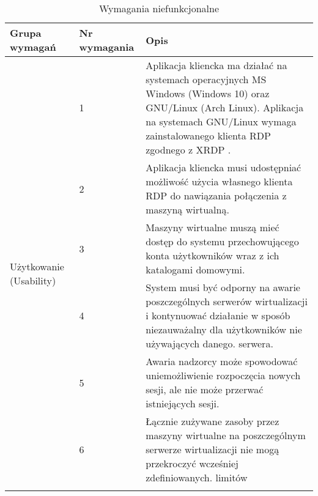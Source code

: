 \documentclass[../wstep.tex]{subfiles}
\begin{document}
\label{requirements:nonfunctional}

\begin{table}[H]
    \caption[Wymagania niefunkcjonalne]{Wymagania niefunkcjonalne}
    \label{non-functional}
    \centering
    \begin{tabular}{|p{}|p{}|p{}|}
        \hline Grupa wymagań                            & Nr wymagania & Opis                                                                                                                                                                                                                       \\ \hline
        \multirow[t]{10}{=}{Użytkowanie (Usability)}    & 1            & Aplikacja kliencka ma działać na systemach operacyjnych MS Windows (Windows 10) oraz GNU/Linux (Arch Linux). Aplikacja na systemach GNU/Linux wymaga zainstalowanego klienta RDP zgodnego z XRDP \parencite{xrdp-clients}. \\ \cline{2-3}
                                                        & 2            & Aplikacja kliencka musi udostępniać możliwość użycia własnego klienta RDP do nawiązania połączenia z maszyną wirtualną.                                                                                                     \\ \cline{2-3}
                                                        & 3            & Maszyny wirtualne muszą mieć dostęp do systemu przechowującego konta użytkowników wraz z ich katalogami domowymi.                                                                                                           \\ \hline
        \multirow[t]{7}{=}{Niezawodność (Reliability)}  & 4            & System musi być odporny na awarie poszczególnych serwerów wirtualizacji i kontynuować działanie w sposób niezauważalny dla użytkowników nie używających danego. serwera.                                                    \\ \cline{2-3}
                                                        & 5            & Awaria nadzorcy może spowodować uniemożliwienie rozpoczęcia nowych sesji, ale nie może przerwać istniejących sesji.                                                                                                         \\ \hline
        \multirow[t]{10}{=}{Wydajność (Performance)}    & 6            & Łącznie zużywane zasoby przez maszyny wirtualne na poszczególnym serwerze wirtualizacji nie mogą przekroczyć wcześniej zdefiniowanych. limitów                                                                              \\ \cline{2-3}

\end{tabular}
\end{table}
\end{document}
